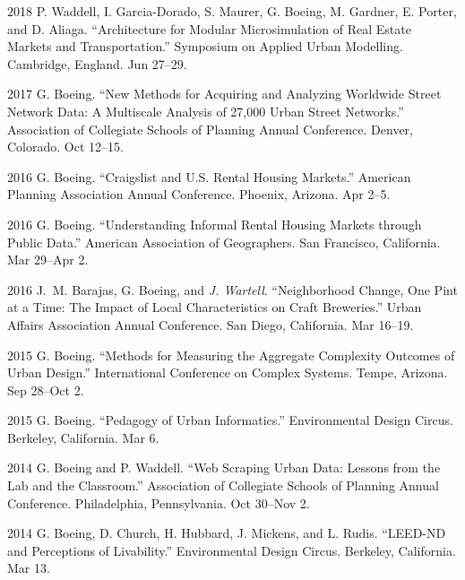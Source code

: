 \documentclass[11pt,letterpaper]{report}
\begin{document}
\begin{tablist}
        \item[2018] \tab{}P. Waddell, I. Garcia-Dorado, S. Maurer, G. Boeing, M. Gardner, E. Porter, and D. Aliaga. \enquote{Architecture for Modular Microsimulation of Real Estate Markets and Transportation.} Symposium on Applied Urban Modelling. Cambridge, England. Jun 27--29.

        \item[2017] \tab{}G. Boeing. \enquote{New Methods for Acquiring and Analyzing Worldwide Street Network Data: A Multiscale Analysis of 27,000 Urban Street Networks.} Association of Collegiate Schools of Planning Annual Conference. Denver, Colorado. Oct 12--15.

        \item[2016] \tab{}G. Boeing. \enquote{Craigslist and U.S. Rental Housing Markets.} American Planning Association Annual Conference. Phoenix, Arizona. Apr 2--5.

        \item[2016] \tab{}G. Boeing. \enquote{Understanding Informal Rental Housing Markets through Public Data.} American Association of Geographers. San Francisco, California. Mar 29--Apr 2.

        \item[2016] \tab{}J.~M. Barajas, G. Boeing, and \textit{J. Wartell}. \enquote{Neighborhood Change, One Pint at a Time: The Impact of Local Characteristics on Craft Breweries.} Urban Affairs Association Annual Conference. San Diego, California. Mar 16--19.

        \item[2015] \tab{}G. Boeing. \enquote{Methods for Measuring the Aggregate Complexity Outcomes of Urban Design.} International Conference on Complex Systems. Tempe, Arizona. Sep 28--Oct 2.

        \item[2015] \tab{}G. Boeing. \enquote{Pedagogy of Urban Informatics.} Environmental Design Circus. Berkeley, California. Mar 6.

        \item[2014] \tab{}G. Boeing and P. Waddell. \enquote{Web Scraping Urban Data: Lessons from the Lab and the Classroom.} Association of Collegiate Schools of Planning Annual Conference. Philadelphia, Pennsylvania. Oct 30--Nov 2.

        \item[2014] \tab{}G. Boeing, D. Church, H. Hubbard, J. Mickens, and L. Rudis. \enquote{LEED-ND and Perceptions of Livability.} Environmental Design Circus. Berkeley, California. Mar 13.

    \end{tablist}
\end{document}
